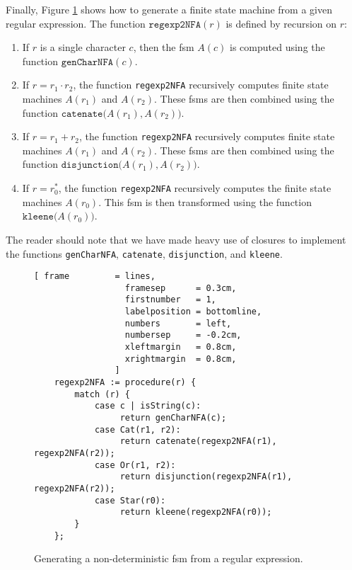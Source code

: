 Finally, Figure \ref{fig:regexp2NFA.stlx} shows how to generate a finite state machine
from a given regular expression.  The function $\texttt{regexp2NFA}(r)$ is defined by
recursion on $r$:
\begin{enumerate}
\item If $r$ is a single character $c$, then the fsm $A(c)$ is computed using
      the function $\texttt{genCharNFA}(c)$.
\item If $r = r_1 \cdot r_2$, the function \texttt{regexp2NFA} recursively computes
      finite state machines $A(r_1)$ and $A(r_2)$.  These fsms are then combined
      using the function $\texttt{catenate}\bigr(A(r_1), A(r_2)\bigr)$.
\item If $r = r_1 + r_2$, the function \texttt{regexp2NFA} recursively computes
      finite state machines $A(r_1)$ and $A(r_2)$.  These fsms are then combined
      using the function $\texttt{disjunction}\bigr(A(r_1), A(r_2)\bigr)$.
\item If $r = r_0^*$, the function \texttt{regexp2NFA} recursively computes
      the finite state machines $A(r_0)$.  This fsm is then transformed
      using the function $\texttt{kleene}\bigr(A(r_0)\bigr)$.
\end{enumerate}
The reader should note that we have made heavy use of closures to implement the functions
\texttt{genCharNFA}, \texttt{catenate}, \texttt{disjunction}, and \texttt{kleene}.

\begin{figure}[!ht]
\centering
\begin{Verbatim}[ frame         = lines, 
                  framesep      = 0.3cm, 
                  firstnumber   = 1,
                  labelposition = bottomline,
                  numbers       = left,
                  numbersep     = -0.2cm,
                  xleftmargin   = 0.8cm,
                  xrightmargin  = 0.8cm,
                ]
    regexp2NFA := procedure(r) {
        match (r) {
            case c | isString(c): 
                 return genCharNFA(c);
            case Cat(r1, r2): 
                 return catenate(regexp2NFA(r1), regexp2NFA(r2));        
            case Or(r1, r2): 
                 return disjunction(regexp2NFA(r1), regexp2NFA(r2));
            case Star(r0): 
                 return kleene(regexp2NFA(r0));
        }
    };
\end{Verbatim}
\vspace*{-0.3cm}
\caption{Generating a non-deterministic fsm from a regular expression.}
\label{fig:regexp2NFA.stlx}
\end{figure}



